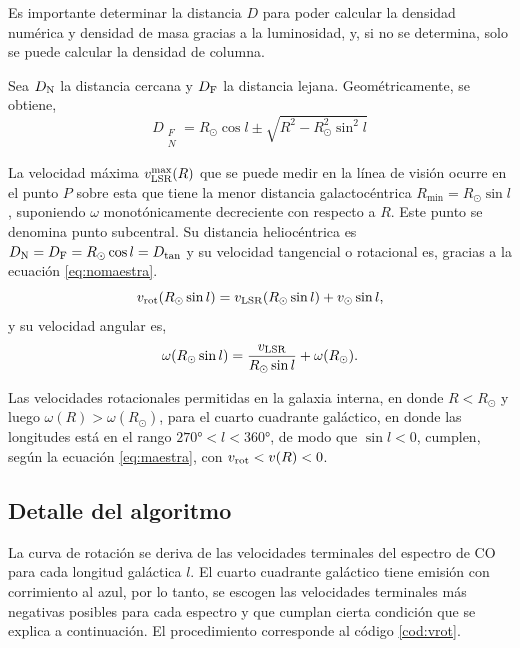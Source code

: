 Es importante determinar la distancia $D$ para poder calcular la densidad numérica y densidad de masa gracias a la luminosidad, y, si no se determina, solo se puede calcular la densidad de columna.

Sea $D_\textnormal{N}$ la distancia cercana y $D_\textnormal{F}$ la distancia lejana. Geométricamente, se obtiene,
\begin{equation}
D_{\substack{F\\N}}=R_\odot\cos l\pm\sqrt{R^2-R_\odot^2\sin^2l}
\end{equation}

La velocidad máxima $v_\textnormal{LSR}^{\max}(R)$ que se puede medir en la línea de visión ocurre en el punto $P$ sobre esta que tiene la menor distancia galactocéntrica $R_{\min}=R_\odot\sin l$, suponiendo $\omega$ monotónicamente decreciente con respecto a $R$. Este punto se denomina punto subcentral. Su distancia heliocéntrica es $D_\textnormal{N}=D_\textnormal{F}=R_\odot\cos l=D_{\tan}$ y su velocidad tangencial o rotacional es, gracias a la ecuación \ref{eq:nomaestra}.
\begin{equation}
v_\textnormal{rot}(R_\odot\sin l)=v_\textnormal{LSR}(R_\odot\sin l)+v_\odot\sin l
,\label{eq:vrot}\end{equation}
y su velocidad angular es,
\begin{equation}
\omega(R_\odot\sin l)=\frac{v_\textnormal{LSR}}{R_\odot\sin l}+\omega(R_\odot)
.\label{eq:wrot}\end{equation}

Las velocidades rotacionales permitidas en la galaxia interna, en donde $R<R_\odot$ y luego $\omega(R)>\omega(R_\odot)$, para el cuarto cuadrante galáctico, en donde las longitudes está en el rango $\ang{270}<l<\ang{360}$, de modo que $\sin l<0$, cumplen, según la ecuación \ref{eq:maestra}, con $v_{\textnormal{rot}}<v(R)<0$.

\subsection{Detalle del algoritmo}

La curva de rotación se deriva de las velocidades terminales del espectro de CO para cada longitud galáctica $l$. El cuarto cuadrante galáctico tiene emisión con corrimiento al azul, por lo tanto, se escogen las velocidades terminales más negativas posibles para cada espectro y que cumplan cierta condición que se explica a continuación. El procedimiento corresponde al código \ref{cod:vrot}.

